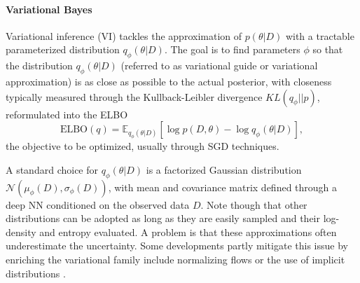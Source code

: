\paragraph{Variational Bayes} 

Variational inference (VI) \cite{blei2017variational} tackles the 
 approximation of  $p(\theta | D)$ with a tractable parameterized
 distribution $q_{\phi}(\theta |D)$. The goal is to find parameters $\phi$ so that the distribution 
$q_{\phi}(\theta |D )$  (referred to as variational guide
or variational approximation)  is as close as possible to the actual posterior, with closeness typically measured through 
the Kullback-Leibler 
divergence $KL(q_{\phi } || p)$, reformulated into the ELBO
\begin{equation}\label{eq:elbo}
\mbox{ELBO}(q) = \mathbb{E}_{q_{\phi}(\theta |D)} \left[ \log p(D,\theta ) - \log q_{\phi}(\theta |D)\right],
\end{equation}
the objective to be optimized,
usually through SGD techniques. 

A standard choice
for $q_{\phi}(\theta |D )$ is a factorized Gaussian 
distribution $\mathcal{N}(\mu_{\phi}(D), \sigma_{\phi}(D))$,
with  mean and covariance matrix defined through a
 deep NN conditioned on the observed data $D$.
 Note though that 
other distributions can be adopted as long as they 
 are easily sampled and their log-density and entropy evaluated. 
A problem is that these approximations often 
underestimate the uncertainty. Some developments
partly mitigate this  issue
by  enriching the variational family include normalizing flows \cite{rezende2015variational} or the use of implicit distributions \cite{huszar2017variational}.

